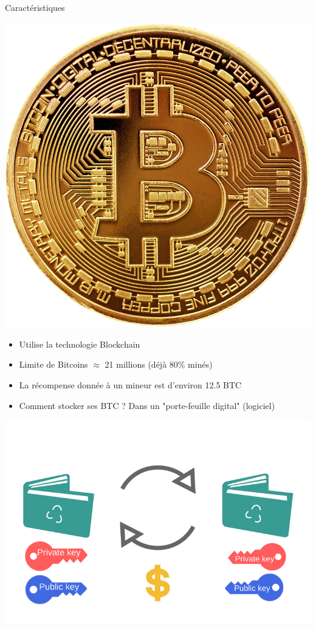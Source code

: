 \documentclass[xcolor=dvipsnames]{beamer}
\begin{document}
\begin{frame}{Caractéristiques}
	\begin{center}
		\includegraphics[scale=0.05]{bitcoinLogo.png}
	\end{center}
	
	\begin{center}
		\begin{itemize}
			\item Utilise la technologie Blockchain
			\item Limite de Bitcoins $\approx$ 21 millions (déjà 80\% minés)
			\item La récompense donnée à un mineur est d'environ 12.5 BTC 
			\item Comment stocker ses BTC ? Dans un "porte-feuille digital" (logiciel)
		\end{itemize}
	\end{center}
	\begin{center}
		\includegraphics[scale=0.15]{wallets.png}
	\end{center}
\end{frame}
\end{document}
